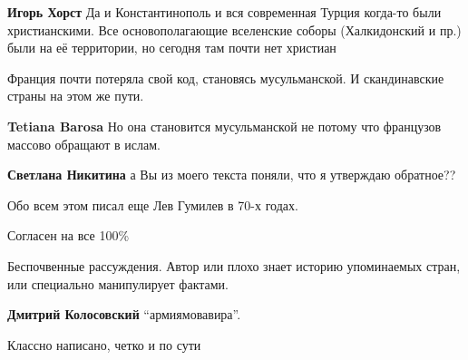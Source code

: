 \begin{itemize}
\textbf{Игорь Хорст} Да и Константинополь и вся современная Турция когда-то были христианскими. Все основополагающие вселенские соборы (Халкидонский и пр.) были на её территории, но сегодня там почти нет христиан

Франция почти потеряла свой код, становясь мусульманской. И скандинавские страны на этом же пути.

\textbf{Tetiana Barosa} Но она становится мусульманской не потому что французов массово обращают в ислам.

\textbf{Светлана Никитина} а Вы из моего текста поняли, что я утверждаю обратное??

Обо всем этом писал еще Лев Гумилев в 70-х годах.

Согласен на все 100\%


Беспочвенные рассуждения. Автор или плохо знает историю упоминаемых стран, или
специально манипулирует фактами.

\textbf{Дмитрий Колосовский} \enquote{армиямовавира}.

Классно написано, четко и по сути

\end{itemize} %
